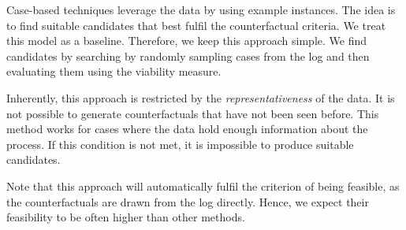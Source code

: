 \documentclass[./../../paper.tex]{subfiles}
\begin{document}
Case-based techniques leverage the data by using example instances. The idea is to find suitable candidates that best fulfil the counterfactual criteria. We treat this model as a baseline. Therefore, we keep this approach simple. We find candidates by searching by randomly sampling cases from the log and then evaluating them using the viability measure.

Inherently, this approach is restricted by the \emph{representativeness} of the data. It is not possible to generate counterfactuals that have not been seen before. This method works for cases where the data hold enough information about the process. If this condition is not met, it is impossible to produce suitable candidates.

Note that this approach will automatically fulfil the criterion of being feasible, as the counterfactuals are drawn from the log directly. Hence, we expect their feasibility to be often higher than other methods.
\end{document}
